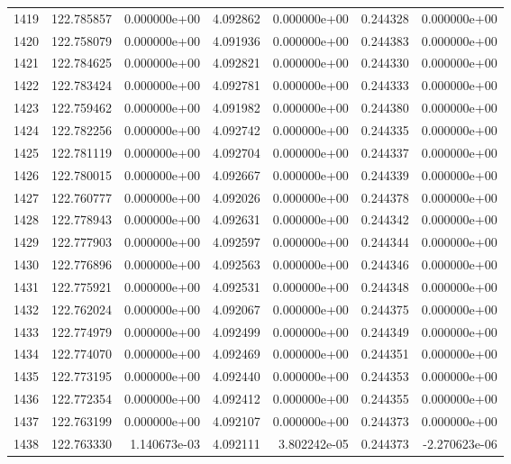 \begin{tabular}{rrrrrrr}
1419 & 122.785857 &  0.000000e+00 &  4.092862 &  0.000000e+00 &    0.244328 &  0.000000e+00 \\
1420 & 122.758079 &  0.000000e+00 &  4.091936 &  0.000000e+00 &    0.244383 &  0.000000e+00 \\
1421 & 122.784625 &  0.000000e+00 &  4.092821 &  0.000000e+00 &    0.244330 &  0.000000e+00 \\
1422 & 122.783424 &  0.000000e+00 &  4.092781 &  0.000000e+00 &    0.244333 &  0.000000e+00 \\
1423 & 122.759462 &  0.000000e+00 &  4.091982 &  0.000000e+00 &    0.244380 &  0.000000e+00 \\
1424 & 122.782256 &  0.000000e+00 &  4.092742 &  0.000000e+00 &    0.244335 &  0.000000e+00 \\
1425 & 122.781119 &  0.000000e+00 &  4.092704 &  0.000000e+00 &    0.244337 &  0.000000e+00 \\
1426 & 122.780015 &  0.000000e+00 &  4.092667 &  0.000000e+00 &    0.244339 &  0.000000e+00 \\
1427 & 122.760777 &  0.000000e+00 &  4.092026 &  0.000000e+00 &    0.244378 &  0.000000e+00 \\
1428 & 122.778943 &  0.000000e+00 &  4.092631 &  0.000000e+00 &    0.244342 &  0.000000e+00 \\
1429 & 122.777903 &  0.000000e+00 &  4.092597 &  0.000000e+00 &    0.244344 &  0.000000e+00 \\
1430 & 122.776896 &  0.000000e+00 &  4.092563 &  0.000000e+00 &    0.244346 &  0.000000e+00 \\
1431 & 122.775921 &  0.000000e+00 &  4.092531 &  0.000000e+00 &    0.244348 &  0.000000e+00 \\
1432 & 122.762024 &  0.000000e+00 &  4.092067 &  0.000000e+00 &    0.244375 &  0.000000e+00 \\
1433 & 122.774979 &  0.000000e+00 &  4.092499 &  0.000000e+00 &    0.244349 &  0.000000e+00 \\
1434 & 122.774070 &  0.000000e+00 &  4.092469 &  0.000000e+00 &    0.244351 &  0.000000e+00 \\
1435 & 122.773195 &  0.000000e+00 &  4.092440 &  0.000000e+00 &    0.244353 &  0.000000e+00 \\
1436 & 122.772354 &  0.000000e+00 &  4.092412 &  0.000000e+00 &    0.244355 &  0.000000e+00 \\
1437 & 122.763199 &  0.000000e+00 &  4.092107 &  0.000000e+00 &    0.244373 &  0.000000e+00 \\
1438 & 122.763330 &  1.140673e-03 &  4.092111 &  3.802242e-05 &    0.244373 & -2.270623e-06 \\

\end{tabular}
